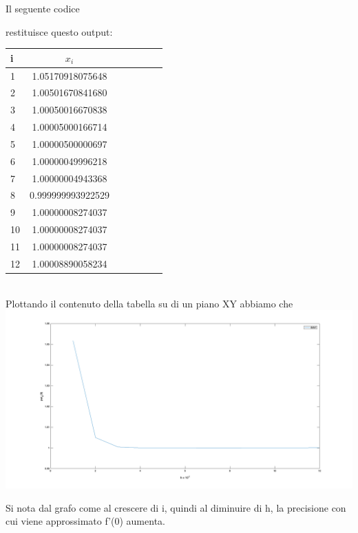 Il seguente codice


restituisce questo output:

\begin{tabular}{l*{6}{c}}
i & \( x_i \)  \\
\hline
1 & 1.05170918075648  \\
2 & 1.00501670841680  \\
3 & 1.00050016670838  \\
4 & 1.00005000166714  \\
5 & 1.00000500000697  \\
6 & 1.00000049996218   \\
7 & 1.00000004943368   \\
8 & 0.999999993922529  \\
9 & 1.00000008274037  \\
10 & 1.00000008274037  \\
11 & 1.00000008274037   \\
12 & 1.00008890058234  \\
\end{tabular} \\

Plottando il contenuto della tabella su di un piano XY abbiamo che \\
\includegraphics[scale=0.3]{cap_1/es4/matlab.png}

Si nota dal grafo come al crescere di i, quindi al diminuire di h, la precisione con cui viene approssimato f'(0) aumenta.
